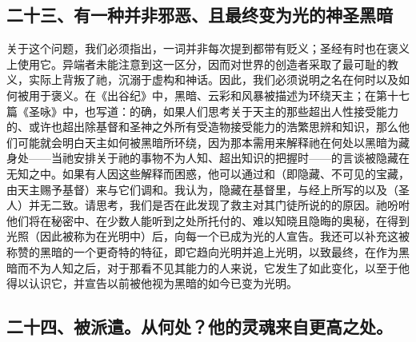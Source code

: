 
\subsection{二十三、有一种并非邪恶、且最终变为光的神圣黑暗}

关于这个问题，我们必须指出，一词并非每次提到都带有贬义；圣经有时也在褒义上使用它。异端者未能注意到这一区分，因而对世界的创造者采取了最可耻的教义，实际上背叛了祂，沉溺于虚构和神话。因此，我们必须说明之名在何时以及如何被用于褒义。在《出谷纪》中，黑暗、云彩和风暴被描述为环绕天主；在第十七篇《圣咏》中，也写道：的确，如果人们思考关于天主的那些超出人性接受能力的、或许也超出除基督和圣神之外所有受造物接受能力的浩繁思辨和知识，那么他们可能就会明白天主如何被黑暗所环绕，因为那本需用来解释祂在何处以黑暗为藏身处——当祂安排关于祂的事物不为人知、超出知识的把握时——的言谈被隐藏在无知之中。如果有人因这些解释而困惑，他可以通过和（即隐藏、不可见的宝藏，由天主赐予基督）来与它们调和。我认为，隐藏在基督里，与经上所写的以及（圣人）并无二致。请思考，我们是否在此发现了救主对其门徒所说的的原因。祂吩咐他们将在秘密中、在少数人能听到之处所托付的、难以知晓且隐晦的奥秘，在得到光照（因此被称为在光明中）后，向每一个已成为光的人宣告。我还可以补充这被称赞的黑暗的一个更奇特的特征，即它趋向光明并追上光明，以致最终，在作为黑暗而不为人知之后，对于那看不见其能力的人来说，它发生了如此变化，以至于他得以认识它，并宣告以前被他视为黑暗的如今已变为光明。\par


\subsection{二十四、被派遣。从何处？他的灵魂来自更高之处。}

